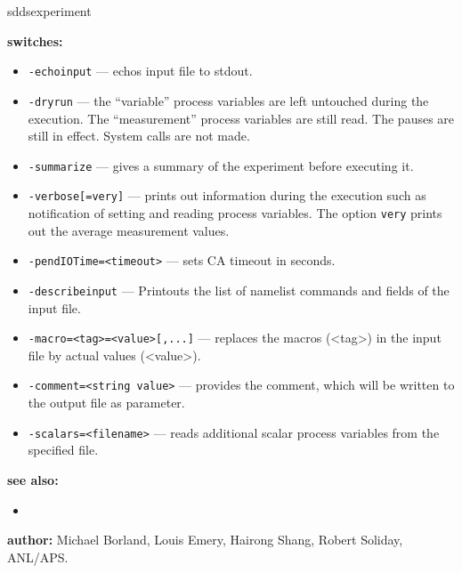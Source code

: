 \begin{sddsprog}{sddsexperiment}
\item \textbf{switches:}
\begin{itemize}
  \item {\verb+-echoinput+} --- echos input file to stdout.
  \item {\verb+-dryrun+} --- the ``variable'' process variables are left untouched during the execution. The ``measurement''
                process variables are still read. The pauses are still in effect. System calls are not made.
  \item {\verb+-summarize+} --- gives a summary of the experiment before executing it.
  \item {\verb+-verbose[=very]+} --- prints out information during the execution such as notification of
                setting and reading process variables. The option \verb+very+ prints out the average measurement values.
  \item {\verb+-pendIOTime=<timeout>+} --- sets CA timeout in seconds.
  \item {\verb+-describeinput+} --- Printouts the list of namelist commands and fields of the input file.
  \item {\verb+-macro=<tag>=<value>[,...]+} --- replaces the macros (<tag>) in the input file by actual values (<value>).
  \item {\verb+-comment=<string value>+} --- provides the comment, which will be written to the output file as parameter.
  \item {\verb+-scalars=<filename>+} --- reads additional scalar process variables from the specified file.
\end{itemize}

\item \textbf{see also:}
\begin{itemize}
  \item {}
\end{itemize}
\item \textbf{author:} Michael Borland, Louis Emery, Hairong Shang, Robert Soliday, ANL/APS.
\end{sddsprog}
